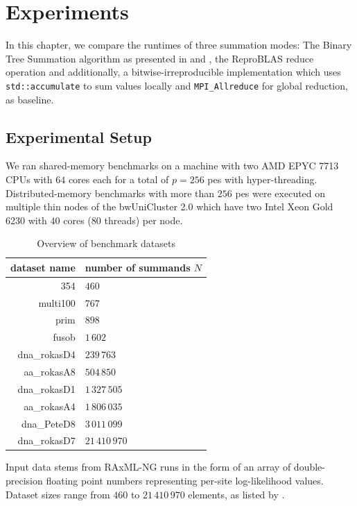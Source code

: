 \chapter{Experiments}
\label{ch:Experiments}

In this chapter, we compare the runtimes of three summation modes:
The Binary Tree Summation algorithm as presented in  and , the ReproBLAS reduce operation and additionally, a bitwise-irreproducible implementation which uses \texttt{std::accumulate} to sum values locally and \texttt{MPI\_Allreduce} for global reduction, as baseline.

\section{Experimental Setup}
\label{sec:ExperimentalSetup}
We ran shared-memory benchmarks on a machine with two AMD EPYC 7713 CPUs with $64$ cores each for a total of $p=256$ \glspl{pe} with hyper-threading.
Distributed-memory benchmarks with more than $256$ \glspl{pe} were executed on multiple thin nodes of the bwUniCluster 2.0 which have two Intel Xeon Gold 6230  with $40$ cores ($80$ threads) per node.


\begin{table}
\centering
\caption{Overview of benchmark datasets}
\label{table:datasets}
\begin{tabular}{r|l}
\textbf{dataset name} & \textbf{number of summands $N$} \\
\hline
354 & $460$ \\
multi100 & $767$ \\
prim & $898$ \\
fusob & $1\,602$ \\
dna\_rokasD4 & $239\,763$ \\
aa\_rokasA8 & $504\,850$ \\
dna\_rokasD1 & $1\,327\,505$ \\
aa\_rokasA4 & $1\,806\,035$ \\
dna\_PeteD8 & $3\,011\,099$ \\
dna\_rokasD7 & $21\,410\,970$ \\
\end{tabular}
\end{table}

Input data stems from RAxML-NG runs in the form of an array of double-precision floating point numbers representing per-site log-likelihood values.
Dataset sizes range from $460$ to $21\,410\,970$ elements, as listed by .

